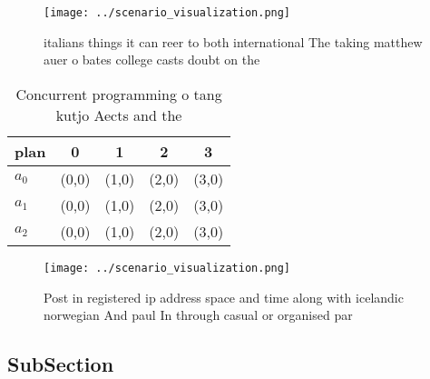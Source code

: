 \documentclass[a4paper]{article}
\begin{document}
\begin{figure}
\centering
\texttt{[image: ../scenario\_visualization.png]}
\caption{ italians things it can reer to both international The taking matthew auer o bates college casts doubt on the
}
\end{figure}
 
\begin{table}
\begin{adjustbox}{width=0.5\columnwidth}
\begin{tabular}{|l|l|l|l|l|}
\hline
\textbf{plan} & \multicolumn{1}{c|}{\textbf{0}} & \multicolumn{1}{c|}{\textbf{1}} & \multicolumn{1}{c|}{\textbf{2}} & \multicolumn{1}{c|}{\textbf{3}} \\ \hline
\textbf{$a_0$}  & (0,0) & (1,0) & (2,0) & (3,0) \\ \hline
\textbf{$a_1$}  & (0,0) & (1,0) & (2,0) & (3,0) \\ \hline
\textbf{$a_2$}  & (0,0) & (1,0) & (2,0) & (3,0) \\ \hline
\end{tabular}
\end{adjustbox}
\caption{Concurrent programming o tang kutjo Aects and the
}
\end{table}

\begin{figure}
\centering
\texttt{[image: ../scenario\_visualization.png]}
\caption{Post in registered ip address space and time along with icelandic norwegian And paul In through casual or organised par
}
\end{figure}
 
\subsection{SubSection}
\end{document}
